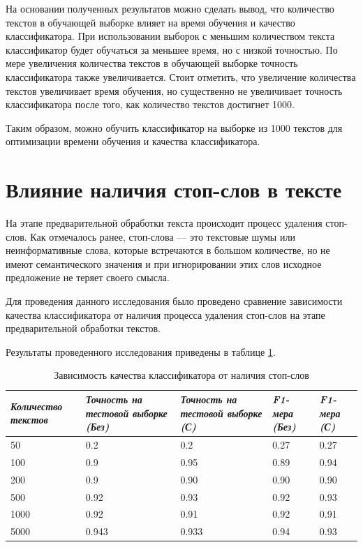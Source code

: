 На основании полученных результатов можно сделать вывод, что количество текстов в обучающей выборке влияет на время обучения и качество классификатора. При использовании выборок с меньшим количеством текста классификатор будет обучаться за меньшее время, но с низкой точностью. По мере увеличения количества текстов в обучающей выборке точность классификатора также увеличивается. Стоит отметить, что увеличение количества текстов увеличивает время обучения, но существенно не увеличивает точность классификатора после того, как количество текстов достигнет 1000.

Таким образом, можно обучить классификатор на выборке из 1000 текстов для оптимизации времени обучения и качества классификатора.

\section{Влияние наличия стоп-слов в тексте}
На этапе предварительной обработки текста происходит процесс удаления стоп-слов. Как отмечалось ранее, стоп-слова --- это текстовые шумы или неинформативные слова, которые встречаются в большом количестве, но не имеют семантического значения и при игнорировании этих слов исходное предложение не теряет своего смысла.

Для проведения данного исследования было проведено сравнение зависимости качества классификатора от наличия процесса удаления стоп-слов на этапе предварительной обработки текстов.

Результаты проведенного исследования приведены в таблице \ref{tab:4.2}.

\begin{table}[H]
	\centering
	\caption{Зависимость качества классификатора от наличия стоп-слов}\label{tab:4.2}
	\begin{tabular}{|m{5em}|m{6.9em}|m{7em}|m{5.5em}|m{4.8em}|}
		\hline
        \textit{Количество текстов} & \textit{Точность на тестовой выборке (Без)} & \textit{Точность на тестовой выборке (С)} & \textit{F1-мера (Без)} & \textit{F1-мера (С)}\\ \hline
		50 & 0.2 & 0.2 & 0.27 &0.27 \\ \hline
        100 & 0.9 & 0.95 & 0.89 &0.94\\ \hline
        200 & 0.9 & 0.90 & 0.90 &0.90\\ \hline
        500 & 0.92 & 0.93 & 0.92 &0.93\\ \hline
        1000 & 0.92 & 0.91 & 0.92 &0.91\\ \hline
        5000 & 0.943 & 0.933 & 0.94 &0.93\\ \hline
	\end{tabular}
\end{table}


